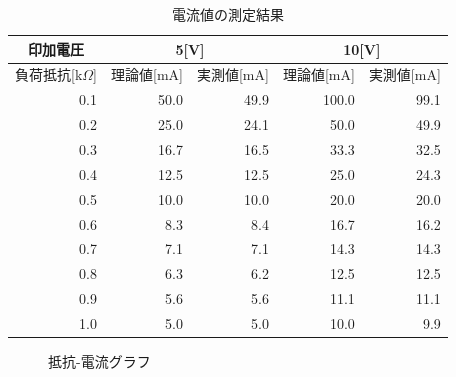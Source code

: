 \documentclass[titlepage]{jarticle}
\begin{document}
	\begin{table}[h]
		\caption{電流値の測定結果} \label{tab:電流値の測定結果}
		\begin{center}
		\renewcommand{\arraystretch}{0.7}
		\begin{tabular}{r||r|r||r|r} \hline
			\multicolumn{1}{c||}{印加電圧} & \multicolumn{2}{c||}{5[V]} & \multicolumn{2}{c}{10[V]}\\ \hline
			\multicolumn{1}{c||}{負荷抵抗[k$\Omega$]} &
			\multicolumn{1}{c|}{理論値[mA]} & \multicolumn{1}{c||}{実測値[mA]} &
			\multicolumn{1}{c|}{理論値[mA]} & \multicolumn{1}{c}{実測値[mA]}\\ \hline
			0.1 & 50.0 & 49.9 & 100.0 & 99.1 \\
			0.2 & 25.0 & 24.1 &  50.0 & 49.9 \\
			0.3 & 16.7 & 16.5 &  33.3 & 32.5 \\
			0.4 & 12.5 & 12.5 &  25.0 & 24.3 \\
			0.5 & 10.0 & 10.0 &  20.0 & 20.0 \\
			0.6 &  8.3 &  8.4 &  16.7 & 16.2 \\
			0.7 &  7.1 &  7.1 &  14.3 & 14.3 \\
			0.8 &  6.3 &  6.2 &  12.5 & 12.5 \\
			0.9 &  5.6 &  5.6 &  11.1 & 11.1 \\
			1.0 &  5.0 &  5.0 &  10.0 &  9.9 \\ \hline
		\end{tabular}
		\end{center}
	\end{table}

	\begin{figure}[h!]
		\caption{抵抗-電流グラフ} \label{fig:抵抗-電流グラフ}
	\end{figure}
\end{document}
